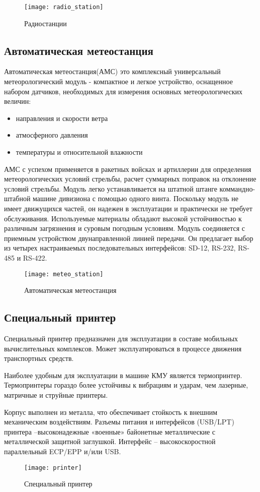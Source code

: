 \begin{figure}[ht]
	\centering
	\texttt{[image: radio\_station]}
	\caption{Радиостанции}
	\label{fig:lit_reiview:meteo:radio_station}
\end{figure}

\subsection{Автоматическая метеостанция}
\label{sub:lit_review:meteo}

Автоматическая метеостанция(АМС) это комплексный универсальный метеорологический модуль - компактное и легкое устройство, оснащенное набором датчиков, необходимых для измерения основных метеорологических величин:
\begin{itemize}
	\item направления и скорости ветра
	\item атмосферного давления
	\item температуры и относительной влажности
\end{itemize}

АМС с успехом применяется в ракетных войсках и артиллерии для определения метеорологических условий стрельбы, расчет суммарных поправок на отклонение условий стрельбы.
Модуль легко устанавливается на штатной штанге коммандно-штабной машине дивизиона с помощью одного винта.
Поскольку модуль не имеет движущихся частей, он надежен в эксплуатации и практически не требует обслуживания.
Используемые материалы обладают высокой устойчивостью к различным загрязнения и суровым погодным условиям.
Модуль соединяется с приемным устройством двунаправленной линией передачи.
Он предлагает выбор из четырех настраиваемых последовательных интерфейсов: SD-12, RS-232, RS-485 и RS-422.

\begin{figure}[ht]
	\centering
	\texttt{[image: meteo\_station]}
	\caption{Автоматическая метеостанция}
	\label{fig:lit_reiview:meteo:meteo_station}
\end{figure}

\subsection{Специальный принтер}
\label{sub:lit_review:spec_printer}
Специальный принтер предназначен для эксплуатации в составе мобильных вычислительных комплексов.
Может эксплуатироваться в процессе движения транспортных средств.

Наиболее удобным для эксплуатации в машине КМУ является термопринтер. Термопринтеры гораздо более устойчивы к вибрациям и ударам, чем лазерные, матричные и струйные принтеры.

Корпус выполнен из металла, что обеспечивает стойкость к внешним механическим воздействиям.
Разъемы питания и интерфейсов (USB/LPT) принтера –высоконадежные «военные» байонетные металлические с металлической защитной заглушкой.
Интерфейс – высокоскоростной параллельный ECP/EPP и/или USB.

\begin{figure}[ht]
	\centering
	\texttt{[image: printer]}
	\caption{Специальный принтер}
	\label{fig:lit_reiview:spec_printer:printer}
\end{figure}
